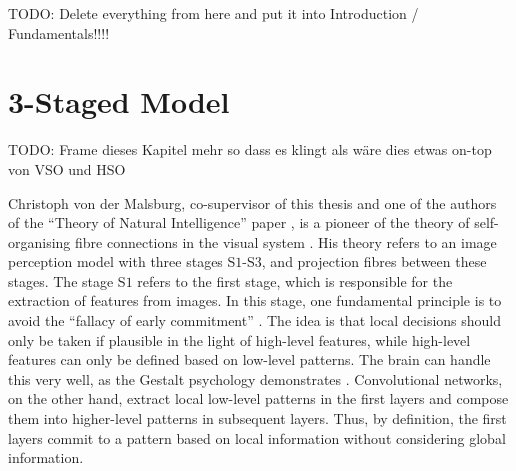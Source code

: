 TODO: Delete everything from here and put it into Introduction / Fundamentals!!!!

\section{3-Staged Model}
TODO: Frame dieses Kapitel mehr so dass es klingt als wäre dies etwas on-top von VSO und HSO

Christoph von der Malsburg, co-supervisor of this thesis and one of the authors of the ``Theory of Natural Intelligence'' paper , is a pioneer of the theory of self-organising fibre connections in the visual system . His theory refers to an image perception model with three stages S$1$-S$3$, and projection fibres between these stages.
The stage S$1$ refers to the first stage, which is responsible for the extraction of features from images. In this stage, one fundamental principle is to avoid the ``fallacy of early commitment'' .
The idea is that local decisions should only be taken if plausible in the light of high-level features, while high-level features can only be defined based on low-level patterns.
The brain can handle this very well, as the Gestalt psychology demonstrates .
Convolutional networks, on the other hand, extract local low-level patterns in the first layers and compose them into higher-level patterns in subsequent layers. Thus, by definition, the first layers commit to a pattern based on local information without considering global information.

